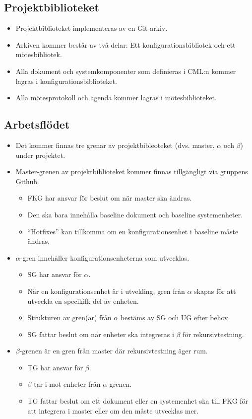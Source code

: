 \documentclass[paper=a4, fontsize=11pt,twoside]{article}
\begin{document}
\subsection*{Projektbiblioteket}
\begin{itemize}
\item Projektbiblioteket implementeras av en Git-arkiv.
\item Arkiven kommer består av två delar: Ett konfigurationsbibliotek och ett mötesbibliotek.
\item Alla dokument och systemkomponenter som definieras i CML:n kommer lagras i konfigurationsbiblioteket.
\item Alla mötesprotokoll och agenda kommer lagras i mötesbiblioteket.
\end{itemize}

\subsection*{Arbetsflödet}
\begin{itemize}
\item Det kommer finnas tre grenar av projektbibleoteket (dvs. master,
  $\alpha$ och $\beta$) under projektet.
\item Master-grenen av projektbiblioteket kommer finnas tillgängligt via gruppens Github.
	\begin{itemize}
	\item FKG har ansvar för beslut om när master ska ändras.
	\item Den ska bara innehålla baseline dokument och baseline systemenheter.
	\item ``Hotfixes'' kan tillkomma om en konfigurationsenhet i baseline måste ändras.
	\end{itemize}
\item $\alpha$-gren innehåller konfigurationsenheterna som utvecklas.
	\begin{itemize}
	\item SG har ansvar för $\alpha$.
	\item När en konfigurationsenhet är i utvekling, gren från $\alpha$ skapas för
	att utveckla en specikifk del av enheten.
	\item Strukturen av gren(ar) från $\alpha$ bestäms av SG och UG efter behov.
	\item SG fattar beslut om när enheter ska integreras i $\beta$ för
	rekursivtestning. 
	\end{itemize}
	
\item $\beta$-grenen är en gren från master där rekursivtestning äger rum.
	\begin{itemize}
	\item TG har ansvar för $\beta$. 
	\item $\beta$ tar i mot enheter från $\alpha$-grenen. 
	\item TG fattar beslut om ett dokument eller en systemenhet ska till FKG för att integrera i master eller om den måste utvecklas mer. 
	\end{itemize}
	
\end{itemize}
\end{document}
